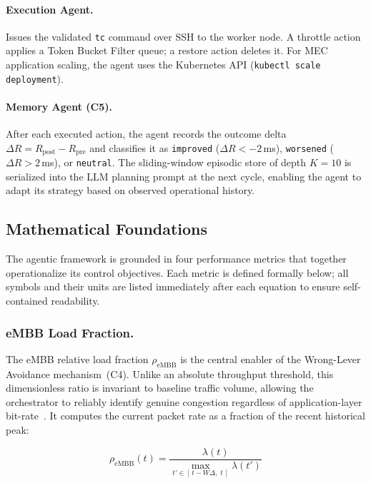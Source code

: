 \documentclass[12pt]{article}
\begin{document}
\paragraph{Execution Agent.}
Issues the validated \texttt{tc} command over SSH to the worker node.
A throttle action applies a Token Bucket Filter queue; a restore action
deletes it. For MEC application scaling, the agent uses the Kubernetes
API (\texttt{kubectl scale deployment}).

\paragraph{Memory Agent (C5).}
After each executed action, the agent records the outcome delta
$\Delta R = R_\text{post} - R_\text{pre}$ and classifies it as
\texttt{improved} ($\Delta R < -2$\,ms), \texttt{worsened}
($\Delta R > 2$\,ms), or \texttt{neutral}. The sliding-window episodic
store of depth $K=10$ is serialized into the LLM planning prompt at the
next cycle, enabling the agent to adapt its strategy based on observed
operational history.

\subsection{Mathematical Foundations}
\label{sec:math}

The agentic framework is grounded in four performance metrics that
together operationalize its control objectives. Each metric is defined
formally below; all symbols and their units are listed immediately after
each equation to ensure self-contained readability.

\subsubsection{eMBB Load Fraction.}
The eMBB relative load fraction $\rho_\text{eMBB}$ is the central
enabler of the Wrong-Lever Avoidance mechanism~(C4). Unlike an absolute
throughput threshold, this dimensionless ratio is invariant to baseline
traffic volume, allowing the orchestrator to reliably identify genuine
congestion regardless of application-layer bit-rate~\cite{hoa2022upf}.
It computes the current packet rate as a fraction of the recent
historical peak:

\begin{equation}
  \rho_\text{eMBB}(t)
    = \frac{\lambda(t)}
           {\displaystyle\max_{t' \in [\,t-W\Delta,\; t\,]} \lambda(t')}
  \label{eq:loadfrac}
\end{equation}
\end{document}
